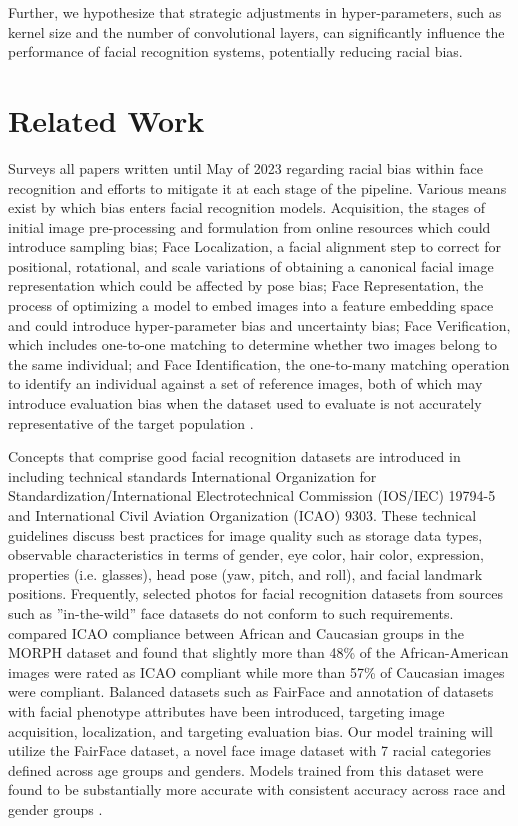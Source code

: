 \documentclass[conference]{IEEEtran}
\begin{document}
Further, we hypothesize that strategic adjustments in hyper-parameters, such as kernel size and the number of convolutional layers, can significantly influence the performance of facial recognition systems, potentially reducing racial bias.

\section{Related Work}
\cite{yucer2023racial} Surveys all papers written until May of 2023 regarding racial bias within face recognition and efforts to mitigate it at each stage of the pipeline. Various means exist by which bias enters facial recognition models. Acquisition, the stages of initial image pre-processing and formulation from online resources which could introduce sampling bias; Face Localization, a facial alignment step to correct for positional, rotational, and scale variations of obtaining a canonical facial image representation which could be affected by pose bias; Face Representation, the process of optimizing a model to embed images into a feature embedding space and could introduce hyper-parameter bias and uncertainty bias; Face Verification, which includes one-to-one matching to determine whether two images belong to the same individual; and Face Identification, the one-to-many matching operation to identify an individual against  a set of reference images, both of which may introduce evaluation bias when the dataset used to evaluate is not accurately representative of the target population \cite{suresh2021framework}.

Concepts that comprise good facial recognition datasets are introduced in \cite{monnerat2007machine} including technical standards International Organization for Standardization/International Electrotechnical Commission (IOS/IEC) 19794-5 and International Civil Aviation Organization (ICAO) 9303. These technical guidelines discuss best practices for image quality such as storage data types, observable characteristics in terms of gender, eye color, hair color, expression, properties (i.e. glasses), head pose (yaw, pitch, and roll), and facial landmark positions. Frequently, selected photos for facial recognition datasets from sources such as ”in-the-wild” face datasets do not conform to such requirements. \cite{vangara2019characterizing} compared ICAO compliance between African and Caucasian groups in the MORPH \cite{ricanek2006morph} dataset and found that slightly more than 48\% of the African-American images were rated as ICAO compliant while more than 57\% of Caucasian images were compliant. Balanced datasets such as FairFace \cite{karkkainen2021fairface} and annotation of datasets with facial phenotype attributes \cite{yucer2022measuring} have been introduced, targeting image acquisition, localization, and targeting evaluation bias. Our model training will utilize the FairFace dataset, a novel face image dataset with 7 racial categories defined across age groups and genders. Models trained from this dataset were found to be substantially more accurate with consistent accuracy across race and gender groups \cite{karkkainen2021fairface}.
\end{document}
